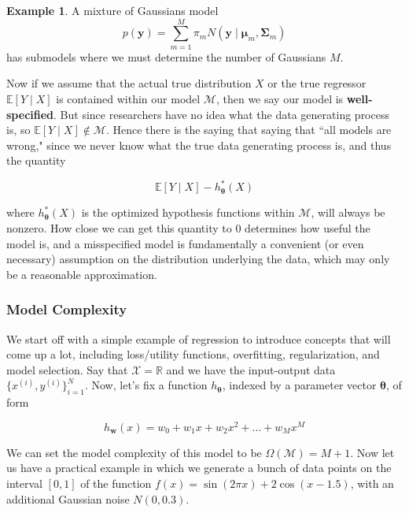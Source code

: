 \documentclass{article}
\theoremstyle{definition}
\newtheorem{example}{Example}[section]
\begin{document}
    \begin{example}
      A mixture of Gaussians model 
        \[p(\mathbf{y}) = \sum_{m=1}^M \pi_m N(\mathbf{y} \mid \boldsymbol{\mu}_m, \boldsymbol{\Sigma}_m )\]
      has submodels where we must determine the number of Gaussians $M$. 
    \end{example}

    Now if we assume that the actual true distribution $X$ or the true regressor $\mathbb{E}[Y\mid X]$ is contained within our model $\mathcal{M}$, then we say our model is \textbf{well-specified}. But since researchers have no idea what the data generating process is, so $\mathbb{E}[Y\mid X] \not\in \mathcal{M}$. Hence there is the saying that saying that ``all models are wrong," since we never know what the true data generating process is, and thus the quantity 

      \[\mathbb{E}[Y \mid X] - h_{\boldsymbol{\theta}}^\ast (X)\]

    where $h_{\boldsymbol{\theta}}^\ast (X)$ is the optimized hypothesis functions within $\mathcal{M}$, will always be nonzero. How close we can get this quantity to $0$ determines how useful the model is, and a misspecified model is fundamentally a convenient (or even necessary) assumption on the distribution underlying the data, which may only be a reasonable approximation. 

    \subsubsection{Model Complexity}

      We start off with a simple example of regression to introduce concepts that will come up a lot, including loss/utility functions, overfitting, regularization, and model selection. Say that $\mathcal{X} = \mathbb{R}$ and we have the input-output data $\{x^{(i)}, y^{(i)}\}_{i=1}^N$. Now, let's fix a function $h_{\boldsymbol{\theta}}$, indexed by a parameter vector $\boldsymbol{\theta}$, of form 

        \[h_\mathbf{w} (x) = w_0 + w_1 x + w_2 x^2 + \ldots + w_M x^M\]

      We can set the model complexity of this model to be $\Omega(\mathcal{M}) = M + 1$. Now let us have a practical example in which we generate a bunch of data points on the interval $[0, 1]$ of the function $f(x) = \sin(2\pi x) + 2\cos (x - 1.5)$, with an additional Gaussian noise $N(0, 0.3)$. 
\end{document}
